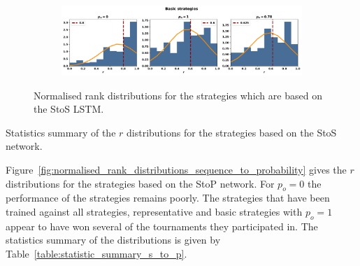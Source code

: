 \begin{figure}[!htbp]
\begin{subfigure}{\textwidth}
    \end{subfigure}
    \par\bigskip
    \begin{subfigure}{\textwidth}
    \includegraphics[width=\textwidth]{src/chapters/07/img/normalised_rank_basic_strategies.pdf}
    \end{subfigure}
    \caption{Normalised rank distributions for the strategies which are based on the StoS
    LSTM.}\label{fig:normalised_rank_distributions_sequence_to_sequence}
\end{figure}

\begin{table}[!htbp]
    \begin{center}
    \resizebox{\textwidth}{!}{
        
    }
\end{center}
\caption{Statistics summary of the \(r\) distributions for the strategies
based on the StoS network.}\label{table:statistic_summary_s_to_s}
\end{table}

Figure~\ref{fig:normalised_rank_distributions_sequence_to_probability} gives the
\(r\) distributions for the strategies based on the StoP network. For \(p_o=0\)
the performance of the strategies remains poorly. The strategies that have been
trained against all strategies, representative and basic strategies with
\(p_o=1\) appear to have won several of the tournaments they
participated in. The statistics summary of the distributions is given by
Table~\ref{table:statistic_summary_s_to_p}.

